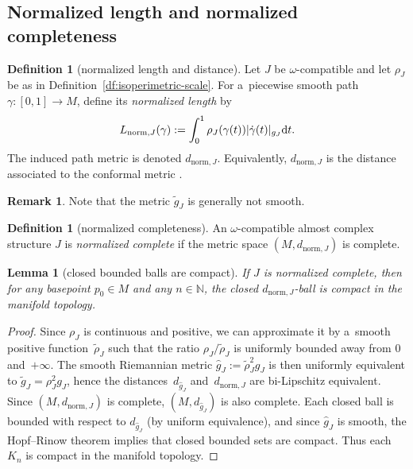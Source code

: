 \documentclass[10pt,a4paper]{amsart}
\numberwithin{equation}{section}
\newcommand{\bN}{{\mathbb N}}
\newtheorem{lm}[Theorem]{Lemma}
\theoremstyle{definition}
\newtheorem{df}[Theorem]{Definition}
\newtheorem{rem}[Theorem]{Remark}
\begin{document}
\subsection{Normalized length and normalized completeness}\label{subsec:normalized-distance}
\begin{df}[normalized length and distance]\label{df:normalized-distance}
Let $J$ be $\omega$-compatible and let $\rho_J$ be as in Definition~\ref{df:isoperimetric-scale}.
For a~piecewise smooth path $\gamma\colon [0,1]\to M$, define its \emph{normalized length} by
\[
L_{\mathrm{norm},J}(\gamma):=\int_{0}^{1}\rho_J(\gamma(t)) |\dot\gamma(t)|_{g_J}{\rm d}t.
\]
The induced path metric is denoted $d_{\mathrm{norm},J}$.
Equivalently, $d_{\mathrm{norm},J}$ is the distance associated to the conformal metric .
\end{df}
\begin{rem}
Note that the metric $\widetilde g_J$ is generally not smooth.
\end{rem}
\begin{df}[normalized completeness]\label{df:normalized-complete}
An $\omega$-compatible almost complex structure $J$ is \emph{normalized complete} if the metric space $(M,d_{\mathrm{norm},J})$ is complete.
\end{df}

\begin{lm}[closed bounded balls are compact]\label{lem:bounded-balls-compact}
 If $J$ is normalized complete, then for any basepoint $p_0\in M$ and any $n\in\bN$, the closed $d_{\mathrm{norm},J}$-ball  is compact in the manifold topology.
 \end{lm}
 \begin{proof}
 Since $\rho_J$ is continuous and positive, we can approximate it by a~smooth positive function~$\widetilde\rho_J$ such that the ratio $\rho_J/\widetilde\rho_J$ is uniformly bounded away from $0$ and~$+\infty$.
 The smooth Riemannian metric $\widehat g_J:=\widetilde\rho_J^{2}g_J$ is then uniformly equivalent to $\widetilde g_J=\rho_J^{2}g_J$, hence the distances~$d_{\widehat g_J}$ and~$d_{\mathrm{norm},J}$ are bi-Lipschitz equivalent.
 Since $(M,d_{\mathrm{norm},J})$ is complete, $(M,d_{\widehat g_J})$ is also complete.
 Each closed ball  is bounded with respect to $d_{\widehat g_J}$ (by uniform equivalence), and since $\widehat g_J$ is smooth, the Hopf--Rinow theorem implies that closed bounded sets are compact.
 Thus each $K_n$ is compact in the manifold topology.
 \end{proof}
\end{document}

